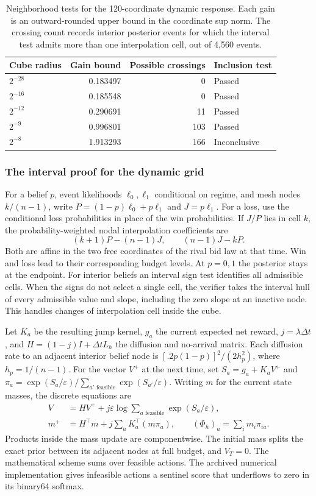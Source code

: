 \begin{table}[htbp]\centering\small
\caption{Neighborhood tests for the 120-coordinate dynamic response. Each
gain is an outward-rounded upper bound in the coordinate sup norm. The
crossing count records interior posterior events for which the interval
test admits more than one interpolation cell, out of 4,560 events.}
\label{tab:cg-radii}
\begin{tabular}{@{}lrrl@{}}\toprule
Cube radius & Gain bound & Possible crossings & Inclusion test\\\midrule
$2^{-28}$ & 0.183497 & 0 & Passed\\
$2^{-16}$ & 0.185548 & 0 & Passed\\
$2^{-12}$ & 0.290691 & 11 & Passed\\
$2^{-9}$  & 0.996801 & 103 & Passed\\
$2^{-8}$  & 1.913293 & 166 & Inconclusive\\\bottomrule
\end{tabular}
\end{table}

\CGpage
\subsubsection{The interval proof for the dynamic grid}
For a belief $p$, event likelihoods $\ell_0,\ell_1$ conditional on regime,
and mesh nodes $k/(n-1)$, write $P=(1-p)\ell_0+p\ell_1$ and $J=p\ell_1$.
For a loss, use the conditional loss probabilities in place of the win
probabilities. If $J/P$ lies in cell $k$, the probability-weighted nodal
interpolation coefficients are
\[
 (k+1)P-(n-1)J,\qquad (n-1)J-kP.
\]
Both are affine in the two free coordinates of the rival bid law at that
time. Win and loss lead to their corresponding budget levels.
At $p=0,1$ the posterior stays at the endpoint. For interior beliefs an
interval sign test identifies all admissible cells. When the signs do not
select a single cell, the verifier takes the interval hull of every
admissible value and slope, including the zero slope at an inactive node.
This handles changes of interpolation cell inside the cube.

Let $K_a$ be the resulting jump kernel, $g_a$ the current expected net
reward, $j=\lambda\Delta t$, and $H=(1-j)I+\Delta t L_h$ the diffusion
and no-arrival matrix. Each diffusion rate to an adjacent interior belief
node is $[.2p(1-p)]^2/(2h_p^2)$, where $h_p=1/(n-1)$.
For the vector $V^+$ at the next time, set
$S_a=g_a+K_aV^+$ and $\pi_a=\exp(S_a/\varepsilon)/
\sum_{a'\text{ feasible}}\exp(S_{a'}/\varepsilon)$. Writing $m$ for
the current state masses, the discrete equations are
\begin{align*}
 V &= HV^+ + j\varepsilon\log\sum_{a\text{ feasible}}\exp(S_a/\varepsilon),\\
 m^+ &= H^\top m+j\sum_a K_a^\top(m\pi_a),\qquad
 (\Phi_h)_a=\sum_i m_i\pi_{ia}.
\end{align*}
Products inside the mass update are componentwise. The initial mass splits
the exact prior between its adjacent nodes at full budget, and $V_T=0$.
The mathematical scheme sums over feasible actions. The archived numerical
implementation gives infeasible actions a sentinel score that underflows to
zero in its binary64 softmax.

